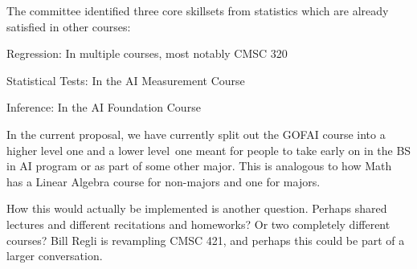 





The committee identified three core skillsets from statistics which are already satisfied in other courses:
\begin{itemize*}
    \item Regression: In multiple courses, most notably CMSC 320
    \item Statistical Tests: In the AI Measurement Course
    \item Inference: In the AI Foundation Course
\end{itemize*}


In the current proposal, we have currently split out the GOFAI course into a higher level one and a lower level one meant for people to take early on in the BS in AI program or as part of some other major.  This is analogous to how Math has a Linear Algebra course for non-majors and one for majors.

How this would actually be implemented is another question.  Perhaps shared lectures and different recitations and homeworks?  Or two completely different courses?  Bill Regli is revampling CMSC 421, and perhaps this could be part of a larger conversation.

